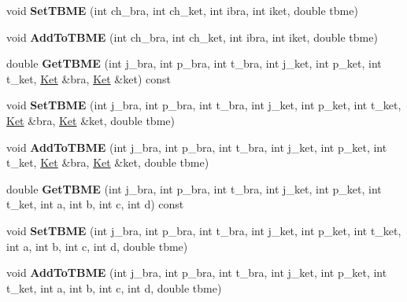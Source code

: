 \begin{DoxyCompactItemize}
\item 
\mbox{\label{classTwoBodyME_a70964978f2900035b751b152f69dece1}} 
void {\bfseries Set\+T\+B\+ME} (int ch\+\_\+bra, int ch\+\_\+ket, int ibra, int iket, double tbme)
\item 
\mbox{\label{classTwoBodyME_a6191d7b60382fe36cf323a63386fb032}} 
void {\bfseries Add\+To\+T\+B\+ME} (int ch\+\_\+bra, int ch\+\_\+ket, int ibra, int iket, double tbme)
\item 
\mbox{\label{classTwoBodyME_a2c073e3f4daed440609d8f7a45a8cf53}} 
double {\bfseries Get\+T\+B\+ME} (int j\+\_\+bra, int p\+\_\+bra, int t\+\_\+bra, int j\+\_\+ket, int p\+\_\+ket, int t\+\_\+ket, \hyperlink{classKet}{Ket} \&bra, \hyperlink{classKet}{Ket} \&ket) const
\item 
\mbox{\label{classTwoBodyME_af3441f4f28102dd66c31ad5d67bba5c4}} 
void {\bfseries Set\+T\+B\+ME} (int j\+\_\+bra, int p\+\_\+bra, int t\+\_\+bra, int j\+\_\+ket, int p\+\_\+ket, int t\+\_\+ket, \hyperlink{classKet}{Ket} \&bra, \hyperlink{classKet}{Ket} \&ket, double tbme)
\item 
\mbox{\label{classTwoBodyME_af3d13a2434e9614de1a40a78c0c16ba1}} 
void {\bfseries Add\+To\+T\+B\+ME} (int j\+\_\+bra, int p\+\_\+bra, int t\+\_\+bra, int j\+\_\+ket, int p\+\_\+ket, int t\+\_\+ket, \hyperlink{classKet}{Ket} \&bra, \hyperlink{classKet}{Ket} \&ket, double tbme)
\item 
\mbox{\label{classTwoBodyME_aac838c8a4fbff88efd7c7ba70cf80873}} 
double {\bfseries Get\+T\+B\+ME} (int j\+\_\+bra, int p\+\_\+bra, int t\+\_\+bra, int j\+\_\+ket, int p\+\_\+ket, int t\+\_\+ket, int a, int b, int c, int d) const
\item 
\mbox{\label{classTwoBodyME_abea5301c27dd939a7e5269405aaf9291}} 
void {\bfseries Set\+T\+B\+ME} (int j\+\_\+bra, int p\+\_\+bra, int t\+\_\+bra, int j\+\_\+ket, int p\+\_\+ket, int t\+\_\+ket, int a, int b, int c, int d, double tbme)
\item 
\mbox{\label{classTwoBodyME_ae29ace6699855265f35a5c5d8b4a4baf}} 
void {\bfseries Add\+To\+T\+B\+ME} (int j\+\_\+bra, int p\+\_\+bra, int t\+\_\+bra, int j\+\_\+ket, int p\+\_\+ket, int t\+\_\+ket, int a, int b, int c, int d, double tbme)

\end{DoxyCompactItemize}
